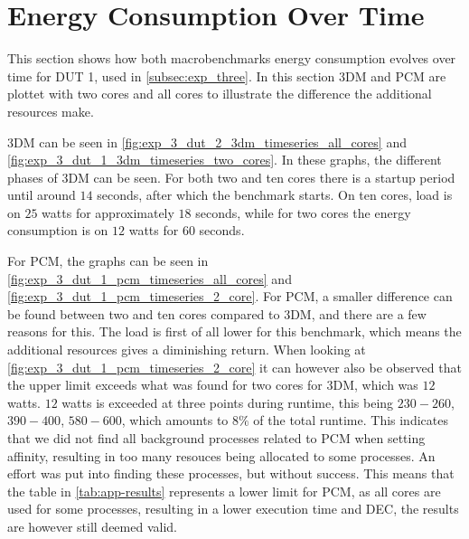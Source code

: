 \section{Energy Consumption Over Time}\label{app:timeseries}

This section shows how both macrobenchmarks energy consumption evolves over time for DUT 1, used in \cref{subsec:exp_three}. In this section 3DM and PCM are plottet with two cores and all cores to illustrate the difference the additional resources make. 

3DM can be seen in \cref{fig:exp_3_dut_2_3dm_timeseries_all_cores} and \cref{fig:exp_3_dut_1_3dm_timeseries_two_cores}. In these graphs, the different phases of 3DM can be seen. For both two and ten cores there is a startup period until around $14$ seconds, after which the benchmark starts. On ten cores, load is on $25$ watts for approximately $18$ seconds, while for two cores the energy consumption is on $12$ watts for $60$ seconds. 




For PCM, the graphs can be seen in \cref{fig:exp_3_dut_1_pcm_timeseries_all_cores} and \cref{fig:exp_3_dut_1_pcm_timeseries_2_core}. For PCM, a smaller difference can be found between two and ten cores compared to 3DM, and there are a few reasons for this. The load is first of all lower for this benchmark, which means the additional resources gives a diminishing return. When looking at \cref{fig:exp_3_dut_1_pcm_timeseries_2_core} it can however also be observed that the upper limit exceeds what was found for two cores for 3DM, which was $12$ watts. $12$ watts  is exceeded at three points during runtime, this being $230-260$, $390-400$, $580-600$, which amounts to $8\%$ of the total runtime. This indicates that we did not find all background processes related to PCM when setting affinity, resulting in too many resouces being allocated to some processes. An effort was put into finding these processes, but without success. This means that the table in \cref{tab:app-results} represents a lower limit for PCM, as all cores are used for some processes, resulting in a lower execution time and DEC, the results are however still deemed valid.


